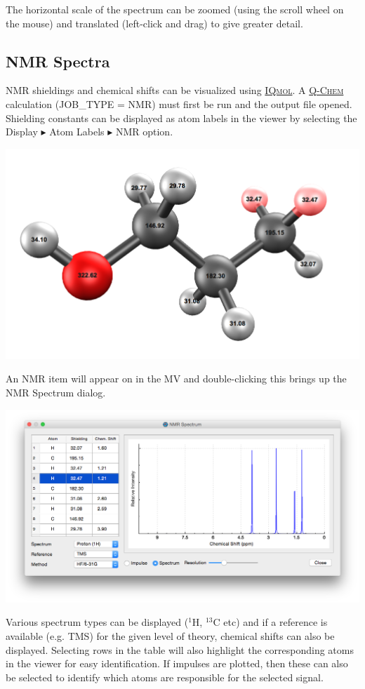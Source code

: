 \documentclass[a4paper,12pt]{article}
\newcommand{\qchem}{\href{http://q-chem.com}{{\scshape Q-Chem}}}
\newcommand{\iqmol}{\href{http://iqmol.org}{{\scshape IQmol}}}
\begin{document}
The horizontal scale of the spectrum can be zoomed (using the scroll wheel on
the mouse) and translated (left-click and drag) to give greater detail.


\newpage
\subsection{NMR Spectra}

NMR shieldings and chemical shifts can be visualized using \iqmol{}.  A 
\qchem{} calculation (JOB\_TYPE = NMR) must first be run and the output
file opened.  Shielding constants can be displayed as atom labels in the
viewer by selecting the Display $\blacktriangleright$ Atom Labels  
$\blacktriangleright$ NMR option.
\begin{center}
\includegraphics[scale=0.25]{figures/NmrDisplay.png} \\
\end{center}
An NMR item will appear on in the MV and double-clicking this brings up the NMR
Spectrum dialog.
\begin{center}
\includegraphics[scale=0.40]{figures/NmrConfigurator.png} \\
\end{center}
Various spectrum types can be displayed ($^1$H, $^{13}$C etc) and if 
a reference is available (e.g. TMS) for the given level of theory, 
chemical shifts can also be displayed.  Selecting rows in the table
will also highlight the corresponding atoms in the viewer for easy
identification.  If impulses are plotted, then these can also be selected
to identify which atoms are responsible for the selected signal.




\end{document}
